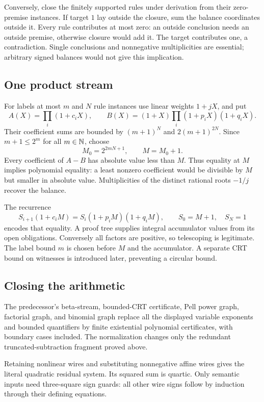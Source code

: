 \documentclass[11pt,letterpaper]{article}
\theoremstyle{remark}\newtheorem{remark}[theorem]{Remark}
\begin{document}
Conversely, close the finitely supported rules under derivation from their
zero-premise instances. If target $1$ lay outside the closure, sum the
balance coordinates outside it. Every rule contributes at most zero:
an outside conclusion needs an outside premise, otherwise closure would
add it. The target contributes one, a contradiction.
Single conclusions and nonnegative multiplicities are essential;
arbitrary signed balances would not give this implication.

\subsection{One product stream}
For labels at most $m$ and $N$ rule instances use linear weights
$1+jX$, and put
\[
 A(X)=\prod_i(1+c_iX),\qquad
 B(X)=(1+X)\prod_i(1+p_iX)(1+q_iX).
\]
Their coefficient sums are bounded by $(m+1)^N$ and
$2(m+1)^{2N}$. Since $m+1\le2^m$ for all $m\in\mathbb N$, choose
\[
 M_0=2^{2mN+1},\qquad M=M_0+1.
\]
Every coefficient of $A-B$ has absolute value less than $M$.
Thus equality at $M$ implies polynomial equality: a least nonzero
coefficient would be divisible by $M$ but smaller in absolute value.
Multiplicities of the distinct rational roots $-1/j$ recover the balance.

The recurrence
\[
 S_{i+1}(1+c_iM)=S_i(1+p_iM)(1+q_iM),\qquad
 S_0=M+1,\quad S_N=1
\]
encodes that equality. A proof tree supplies integral accumulator values
from its open obligations. Conversely all factors are positive, so
telescoping is legitimate. The label bound $m$ is chosen before $M$ and
the accumulator. A separate CRT bound on witnesses is introduced later,
preventing a circular bound.

\subsection{Closing the arithmetic}
The predecessor's beta-stream, bounded-CRT certificate, Pell power graph,
factorial graph, and binomial graph replace all the displayed variable
exponents and bounded quantifiers by finite existential polynomial
certificates, with boundary cases included. The normalization changes only
the redundant truncated-subtraction fragment proved above.

Retaining nonlinear wires and substituting nonnegative affine wires gives
the literal quadratic residual system. Its squared sum is quartic.
Only semantic inputs need three-square sign guards: all other wire signs
follow by induction through their defining equations.
\end{document}
